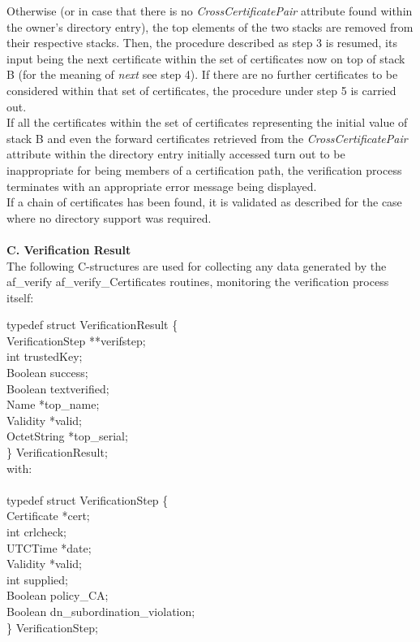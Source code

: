 Otherwise (or in case that there is no {\em CrossCertificatePair} attribute 
found within the owner's directory entry), the top elements of the two stacks
are removed from their respective stacks. Then, the procedure described
as step 3 is resumed, its input being the next certificate within the
set of certificates now on top of stack B (for the meaning of {\em next}
see step 4). If there are no further certificates to be considered 
within that set of certificates, the procedure under step 5 is carried out.
\\ [1em]
If all the certificates within the set of certificates representing
the initial value of stack B and even the forward certificates 
retrieved from the {\em CrossCertificatePair} attribute within the
directory entry initially accessed turn out to be inappropriate 
for being members of a certification path, the verification process
terminates with an appropriate error message being displayed.
\\ [1em]
If a chain of certificates has been found, it is validated as described for the
case where no directory support was required. \\ \\
{\bf C. Verification Result}
\\ [1em]
The following C-structures are used for collecting any data generated by the af\_verify
af\_verify\_Certificates routines, monitoring the verification process itself: 

{\small
\btab
\1      typedef struct VerificationResult \{ \\
\2		VerificationStep \3 **verifstep; \\
\2		int \3	             trustedKey; \\
\2		Boolean \3	     success; \\
\2		Boolean \3	     textverified; \\
\2		Name \3		    *top\_name; \\
\2		Validity \3 	    *valid; \\
\2		OctetString \3	    *top\_serial; \\
\1       \} VerificationResult; \\
\etab
}
with: \\ \\
{\small
\btab
\1      typedef struct VerificationStep \{ \\
\2		Certificate \2	*cert; \\
\2		int \2		crlcheck; \\
\2		UTCTime	\2	*date; \\
\2              Validity \2     *valid; \\
\2		int \2		supplied; \\
\2              Boolean \2      policy\_CA; \\
\2              Boolean \2      dn\_subordination\_violation; \\
\1       \} VerificationStep; \\
\etab
}

